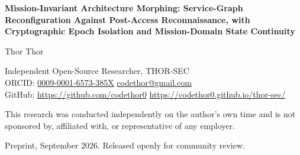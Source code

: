 \documentclass[11pt,letterpaper]{article}
\newcommand{\authorname}{Thor Thor}
\newcommand{\orcidid}{0009-0001-6573-385X}
\begin{document}
\begin{center}
{\LARGE\bfseries Mission-Invariant Architecture Morphing: Service-Graph Reconfiguration Against Post-Access Reconnaissance, with Cryptographic Epoch Isolation and Mission-Domain State Continuity\par}
\vspace{1.2em}
{\large \authorname\par}
\vspace{0.3em}
{\small Independent Open-Source Researcher, THOR-SEC\\
ORCID: \href{https://orcid.org/\orcidid}{\orcidid} \quad \url{codethor@gmail.com}\\
GitHub: \url{https://github.com/codethor0} \quad \url{https://codethor0.github.io/thor-sec/}\par}
\vspace{0.3em}
{\small This research was conducted independently on the author's own time and is not sponsored by, affiliated with, or representative of any employer.\par}
\vspace{0.4em}
{\small Preprint, September 2026. Released openly for community review.\par}
\end{center}
\end{document}
